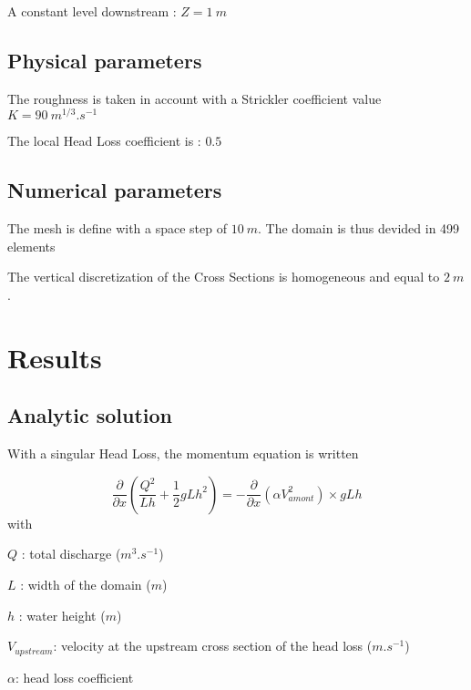 A constant level downstream : $ Z = 1\ m $


\subsection{Physical parameters}

The roughness is taken in account with a Strickler coefficient value $ K = 90\ m^{1/3}.s^{-1} $

The local Head Loss coefficient is : $0.5$

\subsection{Numerical parameters}

The mesh is define with a space step of $ 10\ m $. The domain is thus devided in 499 elements

The vertical discretization of the Cross Sections is homogeneous and equal to $ 2\ m $.






\section{Results}

\subsection{Analytic solution}
With a singular Head Loss, the momentum equation is written

\begin{equation}
 \frac{\partial}{\partial x}\left(\displaystyle \frac{Q^2}{Lh}+\frac{1}{2}gLh^2\right)=-\frac{\partial{}}{\partial x}\displaystyle(\alpha V^{2}_{amont})\times gLh
\end{equation}
with
\begin{description}
\item $ Q $ : 	total discharge ($ m^3.s^{-1} $)
\item $ L $ : 	width of the domain ($ m $)
\item $ h $ : 	water height ($ m $)
\item $ V_{upstream} $: velocity at the upstream cross section of the head loss ($ m.s^{-1} $)
\item $ \alpha $: head loss coefficient
\end{description}

